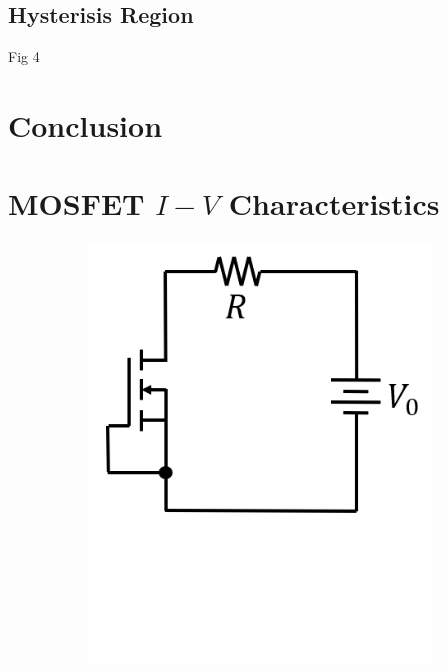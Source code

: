 \documentclass[%
 aip,
amsmath,amssymb,
reprint,
]{revtex4-1}
\begin{document}
\subsection{Hysterisis Region}
Fig 4

\section{\label{sec:Conclusion} Conclusion}

\appendix

\section{\label{mosfetiv}MOSFET $I-V$ Characteristics}

\begin{figure}[!htbp]
  \begin{subfigure}{0.15\textwidth}
    \includegraphics[width=\linewidth]{figures/MOSFET_circuit.png}
    \caption{}
    \label{MOSFET_circuitfig_a}
  \end{subfigure}%

\end{figure}
\end{document}

